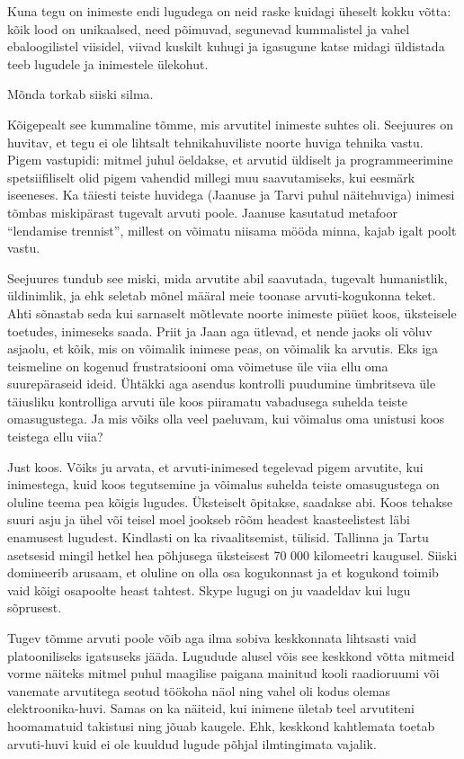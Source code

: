 Kuna tegu on inimeste endi lugudega on neid raske kuidagi üheselt kokku võtta: 
kõik lood on unikaalsed, need põimuvad, segunevad kummalistel ja vahel 
ebaloogilistel viisidel, viivad kuskilt kuhugi ja igasugune katse midagi 
üldistada teeb lugudele ja inimestele ülekohut. 

Mõnda  torkab siiski silma. 

Kõigepealt see kummaline tõmme, mis arvutitel inimeste suhtes oli. Seejuures on 
huvitav, et tegu ei ole lihtsalt tehnikahuviliste noorte huviga tehnika vastu. 
Pigem vastupidi: mitmel juhul öeldakse, et arvutid üldiselt ja programmeerimine 
spetsiifiliselt olid pigem vahendid millegi muu saavutamiseks, kui eesmärk 
iseeneses. Ka täiesti teiste huvidega (Jaanuse ja Tarvi puhul näitehuviga) 
inimesi tõmbas miskipärast tugevalt arvuti poole. Jaanuse kasutatud metafoor 
\enquote{lendamise trennist}, millest on võimatu niisama mööda minna, kajab 
igalt poolt vastu. 

Seejuures tundub see miski, mida arvutite abil saavutada, tugevalt humanistlik, 
üldinimlik, ja ehk seletab mõnel määral meie toonase arvuti-kogukonna teket. 
Ahti sõnastab seda kui sarnaselt mõtlevate noorte inimeste püüet koos, 
üksteisele toetudes, inimeseks saada. Priit ja Jaan aga ütlevad, et nende jaoks 
oli võluv asjaolu, et kõik, mis on võimalik inimese peas, on võimalik ka 
arvutis. Eks iga teismeline on kogenud frustratsiooni oma võimetuse üle viia 
ellu oma suurepäraseid ideid. Ühtäkki aga asendus kontrolli puudumine 
ümbritseva üle täiusliku kontrolliga arvuti üle koos piiramatu vabadusega 
suhelda teiste omasugustega.  Ja mis võiks olla veel paeluvam, kui võimalus oma 
unistusi koos teistega ellu viia?

Just koos. Võiks ju arvata, et arvuti-inimesed tegelevad pigem arvutite, kui 
inimestega, kuid koos tegutsemine ja võimalus suhelda teiste omasugustega on 
oluline teema pea kõigis lugudes. Üksteiselt õpitakse, saadakse abi. Koos 
tehakse suuri asju ja ühel või teisel moel jookseb rõõm headest kaasteelistest 
läbi enamusest lugudest. Kindlasti on ka rivaalitsemist, tülisid. Tallinna ja 
Tartu asetsesid mingil hetkel hea põhjusega üksteisest 70 000 kilomeetri 
kaugusel. Siiski domineerib arusaam, et 
oluline on olla osa kogukonnast ja et kogukond toimib vaid kõigi osapoolte 
heast tahtest. Skype lugugi on ju vaadeldav kui lugu sõprusest.

Tugev tõmme arvuti poole võib  aga ilma sobiva keskkonnata lihtsasti vaid 
platooniliseks igatsuseks jääda. Lugudude alusel  võis see keskkond võtta 
mitmeid vorme näiteks mitmel puhul maagilise paigana mainitud kooli raadioruumi 
või vanemate arvutitega seotud töökoha näol ning vahel oli kodus olemas 
elektroonika-huvi. Samas on ka näiteid, kui inimene ületab teel arvutiteni 
hoomamatuid takistusi ning jõuab kaugele. Ehk, keskkond kahtlemata toetab 
arvuti-huvi kuid ei ole kuuldud lugude põhjal ilmtingimata vajalik.

